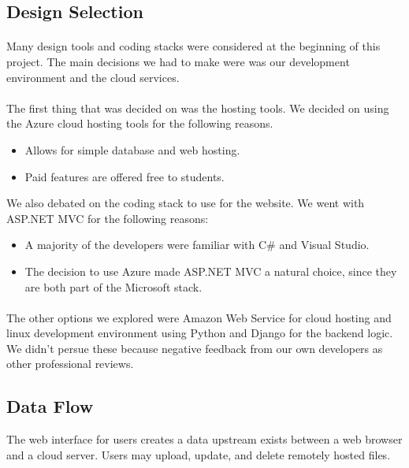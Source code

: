  
 
   \subsection{Design Selection}
   \paragraph{}
 Many design tools and coding stacks were considered at the beginning of this project.
 The main decisions we had to make were was our development environment and the cloud services.
 
 \paragraph{}
 The first thing that was decided on was the hosting tools.
 We decided on using the Azure cloud hosting tools for the following reasons.

 \begin{itemize}
    \item Allows for simple database and web hosting.
    \item Paid features are offered free to students.
 \end{itemize}

 We also debated on the coding stack to use for the website.
 We went with ASP.NET MVC for the following reasons:
\begin{itemize}
    \item A majority of the developers were familiar with C\# and Visual Studio.
    \item The decision to use Azure made ASP.NET MVC a natural choice, since they are both part of the Microsoft stack.
\end{itemize}

\paragraph{}
The other options we explored were Amazon Web Service for cloud hosting and linux development environment using Python and Django for the backend logic.
We didn't persue these because negative feedback from our own developers as other professional reviews.

 \subsection{Data Flow}
The web interface for users creates a data upstream exists between a web browser and a cloud server. Users may upload, update, and delete remotely hosted files.

